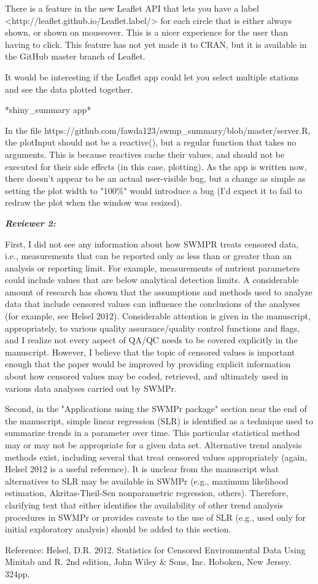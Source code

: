 \documentclass[letterpaper,12pt]{article}\usepackage[]{graphicx}\usepackage[]{color}
\newcommand{\Bigtxt}[1]{\textbf{\textit{#1}}}
\begin{document}
There is a feature in the new Leaflet API that lets you have a label <http://leaflet.github.io/Leaflet.label/> for each circle that is either always shown, or shown on mouseover. This is a nicer experience for the user than having to click. This feature has not yet made it to CRAN, but it is available in the GitHub master branch of Leaflet.

It would be interesting if the Leaflet app could let you select multiple stations and see the data plotted together.

*shiny\_summary app*

In the file https://github.com/fawda123/swmp\_summary/blob/master/server.R, the plotInput should not be a reactive(), but a regular function that takes no arguments. This is because reactives cache their values, and should not be executed for their side effects (in this case, plotting). As the app is written now, there doesn't appear to be an actual user-visible bug, but a change as simple as setting the plot width to "100\%" would introduce a bug (I'd expect it to fail to redraw the plot when the window was resized).

\Bigtxt{Reviewer 2:}

First, I did not see any information about how SWMPR treats censored data, i.e., measurements that can be reported only as less than or greater than an analysis or reporting limit. For example, measurements of nutrient parameters could include values that are below analytical detection limits. A considerable amount of research has shown that the assumptions and methods used to analyze data that include censored values can influence the conclusions of the analyses (for example, see Helsel 2012). Considerable attention is given in the manuscript, appropriately, to various quality assurance/quality control functions and flags, and I realize not every aspect of QA/QC needs to be covered explicitly in the manuscript. However, I believe that the topic of censored values is important enough that the paper would be improved by providing explicit information about how censored values may be coded, retrieved, and ultimately used in various data analyses carried out by SWMPr.

Second, in the "Applications using the SWMPr package" section near the end of the manuscript, simple linear regression (SLR) is identified as a technique used to summarize trends in a parameter over time. This particular statistical method may or may not be appropriate for a given data set. Alternative trend analysis methods exist, including several that treat censored values appropriately (again, Helsel 2012 is a useful reference). It is unclear from the manuscript what alternatives to SLR may be available in SWMPr (e.g., maximum likelihood estimation, Akritas-Theil-Sen nonparametric regression, others). Therefore, clarifying text that either identifies the availability of other trend analysis procedures in SWMPr or provides caveats to the use of SLR (e.g., used only for initial exploratory analysis) should be added to this section.

Reference:
Helsel, D.R. 2012. Statistics for Censored Environmental Data Using Minitab and R. 2nd edition, John Wiley \& Sons, Inc. Hoboken, New Jersey. 324pp.
\end{document}
